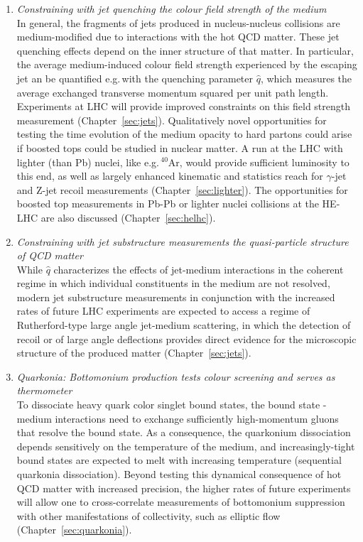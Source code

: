 \documentclass[../report.tex]{subfiles}
\begin{document}
\begin{enumerate}
\item {\it Constraining with jet quenching the colour field strength of the medium}\\ In general, the fragments of jets produced in nucleus-nucleus collisions are medium-modified due to  interactions with the hot QCD matter. These jet quenching effects depend on the inner structure of that matter. In particular, the average medium-induced colour field strength experienced by the escaping jet an be quantified e.g.\,with the quenching parameter $\hat q$, which measures the average exchanged transverse momentum squared per unit path length. Experiments at LHC will provide improved constraints on this field strength measurement (Chapter~\ref{sec:jets}).  Qualitatively novel opportunities for testing the time evolution of the medium opacity to hard partons could arise if boosted tops could be studied in nuclear matter. A run at the LHC with lighter (than Pb) nuclei, like e.g.\,$^{40}$Ar, would provide sufficient luminosity to this end, as well as largely enhanced kinematic and statistics reach for $\gamma$-jet and Z-jet recoil measurements (Chapter~\ref{sec:lighter}). The opportunities for boosted top measurements in Pb-Pb or lighter nuclei collisions at the HE-LHC are also discussed (Chapter~\ref{sec:helhc}).
\item {\it Constraining with jet substructure measurements the quasi-particle structure of QCD matter}\\ While $\hat q$  characterizes the effects of jet-medium interactions in the coherent regime in which individual constituents in the medium are not resolved, modern jet substructure measurements in conjunction with the increased rates of future LHC experiments are expected to access a regime of Rutherford-type large angle jet-medium scattering, in which the detection of recoil or of large angle deflections provides direct evidence for the microscopic structure of the produced matter (Chapter~\ref{sec:jets}).  
\item {\it Quarkonia: Bottomonium production tests colour screening and serves as thermometer}\\To dissociate heavy quark color singlet bound states, the bound state - medium interactions need to exchange sufficiently high-momentum gluons that resolve the bound state. As a consequence, the quarkonium dissociation depends sensitively on the temperature of the medium, and 
increasingly-tight bound states are expected to melt with increasing temperature (sequential quarkonia dissociation). Beyond testing this dynamical consequence of hot QCD matter with increased precision, the higher rates of future experiments will allow one to cross-correlate measurements of bottomonium suppression with other manifestations of collectivity, such as elliptic flow (Chapter~\ref{sec:quarkonia}).

\end{enumerate}
\end{document}
